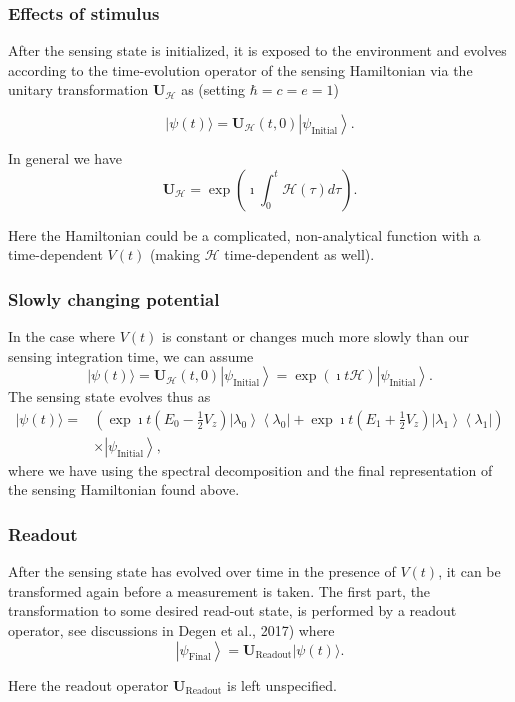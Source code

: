 \documentclass{beamer}
\begin{document}
\begin{frame}
\frametitle{Effects of stimulus}

After the sensing state is initialized, it is exposed to the
environment and evolves according to the time-evolution operator of
the sensing Hamiltonian via the unitary transformation $\bm{U}_{\mathcal{H}}$ as (setting $\hbar=c=e=1$)

\[
|\psi(t)\rangle=\bm{U}_{\mathcal{H}}(t, 0)\left|\psi_{\mathrm{Initial}}\right\rangle.
\]

In general we have
\[ \bm{U}_{\mathcal{H}}=\exp{(\imath\int_{0}^{t}
\mathcal{H}(\tau) d \tau)}.
\]

Here the Hamiltonian could be a
complicated, non-analytical function with a time-dependent $V(t)$
(making $\mathcal{H}$ time-dependent as well).
\end{frame}

\begin{frame}
\frametitle{Slowly changing potential}

In the case where $V(t)$ is constant or changes much more slowly than our sensing integration time, we can assume
\[
|\psi(t)\rangle=\bm{U}_{\mathcal{H}}(t, 0)\left|\psi_{\mathrm{Initial}}\right\rangle=\exp{(\imath t \mathcal{H})}\left|\psi_{\mathrm{Initial}}\right\rangle.
\]
The sensing state evolves thus as
\begin{align*}
|\psi(t)\rangle=&\left(\exp{\imath t\left(E_{0}-\frac{1}{2}  V_z\right)}\left|\lambda_{0}\right\rangle\left\langle\lambda_{0}\right|+\exp{\imath t\left(E_{1}+\frac{1}{2}  V_z\right)}\left|\lambda_{1}\right\rangle\left\langle\lambda_{1}\right|\right) \\
& \times \left|\psi_{\mathrm{Initial}}\right\rangle,
\end{align*}
where we have using the spectral decomposition and the final representation of the
sensing Hamiltonian found above.
\end{frame}

\begin{frame}
\frametitle{Readout}

After the sensing state has evolved over time in the presence of $V(t)$, it
can be transformed again before a measurement is taken. The first
part, the transformation to some desired read-out state, is performed
by a readout  operator, see discussions in Degen et al., 2017) where
\[
\left|\psi_{\mathrm{Final}}\right\rangle=\bm{U}_{\mathrm{Readout}}|\psi(t)\rangle.
\]

Here the readout operator $\bm{U}_{\mathrm{Readout}}$ is left unspecified.
\end{frame}
\end{document}
